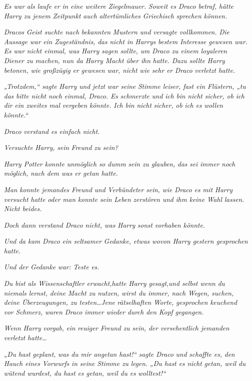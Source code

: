 {\emph{Es war als laufe er in eine weitere Ziegelmauer. Soweit es Draco betraf, hätte Harry zu jenem Zeitpunkt auch altertümliches Griechisch sprechen können.}

\emph{Dracos Geist suchte nach} \emph{bekannten} \emph{Mustern und versagte vollkommen. Die Aussage war ein Zugeständnis, das nicht in Harrys bestem Interesse gewesen war. Es war nicht einmal, was Harry sagen sollte, um Draco zu einem loyaleren Diener zu machen, nun da Harry Macht über ihn hatte. Dazu sollte Harry betonen, wie großzügig er gewesen war, nicht wie sehr er Draco verletzt hatte.}

\emph{„Trotzdem,“ sagte Harry und jetzt war seine Stimme leiser, fast ein Flüstern, „tu das bitte nicht noch einmal, Draco. Es schmerzte und ich bin nicht sicher, ob ich dir ein zweites mal vergeben könnte. Ich bin nicht} \emph{sicher, ob ich es wollen könnte.“}

\emph{Draco verstand es einfach nicht.}

\emph{Versuchte Harry, sein} \emph{\emph{Freund}} \emph{zu sein?}

\emph{Harry Potter konnte unmöglich so dumm sein zu glauben, das sei immer noch möglich, nach dem was er getan hatte.}

\emph{Man konnte jemandes Freund und Verbündeter sein, wie Draco es mit Harry versucht hatte oder man konnte sein Leben zerstören und ihm keine Wahl lassen. Nicht beides.}

\emph{Doch dann verstand Draco nicht, was Harry} \emph{\emph{sonst}} \emph{vorhaben könnte.}

\emph{Und da kam Draco ein seltsamer Gedanke, etwas wovon Harry gestern gesprochen hatte.}

\emph{Und der Gedanke war:} \emph{\emph{Teste es.}}

\emph{\emph{Du bist als Wissenschaftler erw}\emph{acht,}hatte Harry gesagt,\emph{und selbst wenn du niemals lernst, deine Macht zu nutzen, wirst du immer, nach Wegen, suchen, deine Überzeugungen, zu testen…}Jene} \emph{rätselhaften Worte, gesprochen keuchend vor Schmerz, waren Draco immer wieder durch den Kopf gegangen.}

\emph{Wenn Harry} \emph{\emph{vorgab,}} \emph{ein} \emph{reuiger Freund zu sein, der versehentlich jemanden verletzt hatte…}

\emph{„Du hast} \emph{\emph{geplant,}} \emph{was du mir angetan hast!“ sagte Draco und schaffte es, den Hauch eines Vorwurfs in seine Stimme zu legen. „Du hast es nicht getan, weil du wütend wurdest, du hast es getan, weil du es} \emph{\emph{wolltest!}“}

}
